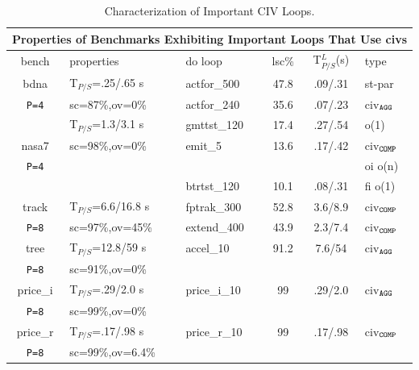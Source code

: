 \documentclass{sig-alternate}
\begin{document}
\begin{table}[t] 
\centering
\scriptsize   
\begin{tabular}{|c|l|l|c|c|l|} \hline
\multicolumn{6}{|c|}{Properties of Benchmarks Exhibiting Important Loops That Use {\sc civ}s} \\ \hline
{\sc bench} & {\sc properties} & {\sc do loop}  & {\sc lsc}\%  & T$_{P/S}^L$(s) & {\sc type} \\ \hline
{\sc bdna}  &  T$_{P/S}$=.25/.65 s         & {\sc actfor\_500}  & 47.8 & .09/.31 & {\sc st-par}     \\ 
{\tt P=4}         &  {\sc sc}=87\%,{\sc ov}=0\%  & {\sc actfor\_240}  & 35.6 & .07/.23 & {\sc civ}$_{\tt{}AGG}$    \\ \hline 
             &  T$_{P/S}$=1.3/3.1 s         & {\sc gmttst\_120}  & 17.4 & .27/.54 & {\sc {\sc fi} {\sc o(1)}}   \\ 
{\sc nasa7}  &  {\sc sc}=98\%,{\sc ov}=0\%  & {\sc emit\_5}      & 13.6 & .17/.42 & {\sc civ}$_{\tt{}COMP}$   \\  %
{\tt P=4}        &                              &                      &                & & {\sc oi} {\sc o(n)}       \\
             &                              & {\sc btrtst\_120}  & 10.1 & .08/.31 & {\sc fi} {\sc o(1)}        \\ \hline
{\sc track}  &  T$_{P/S}$=6.6/16.8 s         & {\sc fptrak\_300}  & 52.8 & 3.6/8.9 & {\sc civ}$_{\tt{}COMP}$   \\ 
{\tt P=8}        &  {\sc sc}=97\%,{\sc ov}=45\%  & {\sc extend\_400}  & 43.9 & 2.3/7.4 & {\sc civ}$_{\tt{}COMP}$ \\ \hline 
{\sc tree}   &  T$_{P/S}$=12.8/59 s        & {\sc accel\_10}    & 91.2 & 7.6/54 & {\sc civ}$_{\tt{}AGG}$  \\            %
{\tt P=8}        &  {\sc sc}=91\%,{\sc ov}=0\% &                    &      &          &                           \\ \hline 
{\sc price\_i} &  T$_{P/S}$=.29/2.0 s        & {\sc price\_i\_10} & 99   & .29/2.0  & {\sc civ}$_{\tt{}AGG}$ \\ 
{\tt P=8}          &  {\sc sc}=99\%,{\sc ov}=0\% &                    &      &          &                           \\ \hline 
{\sc price\_r} &  T$_{P/S}$=.17/.98 s          & {\sc price\_r\_10}& 99   & .17/.98  & {\sc civ}$_{\tt{}COMP}$ \\ 
{\tt P=8}          &  {\sc sc}=99\%,{\sc ov}=6.4\% &                  &      &          &                          \\ \hline 
\end{tabular}
\caption{ Characterization of Important CIV Loops.
}
\label{tab:LoopBenchProps}
\end{table}
\end{document}

